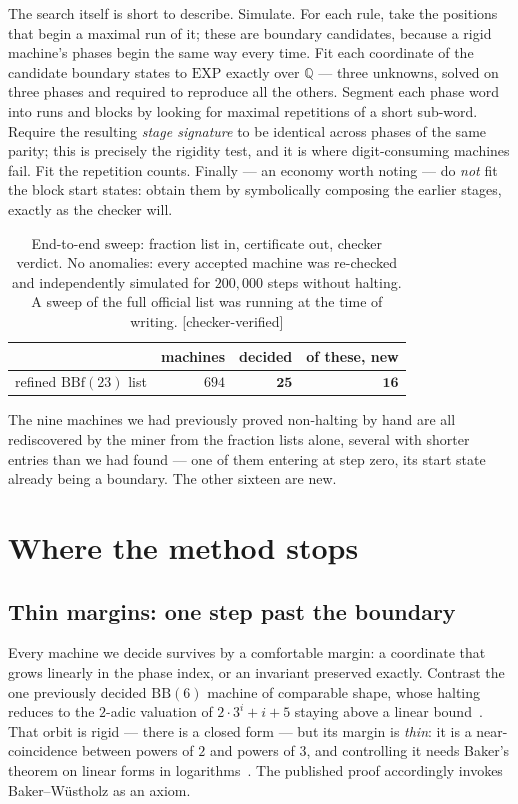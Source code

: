 \documentclass[11pt,a4paper]{article}
\theoremstyle{plain}
\theoremstyle{definition}
\newcommand{\Chk}{\textcolor{linkc}{\textsf{[checker-verified]}}}
\begin{document}
The search itself is short to describe. Simulate. For each rule, take the
positions that begin a maximal run of it; these are boundary candidates,
because a rigid machine's phases begin the same way every time. Fit each
coordinate of the candidate boundary states to $\mathrm{EXP}$ exactly over
$\mathbb{Q}$ --- three unknowns, solved on three phases and required to
reproduce all the others. Segment each phase word into runs and blocks by
looking for maximal repetitions of a short sub-word. Require the resulting
\emph{stage signature} to be identical across phases of the same parity;
this is precisely the rigidity test, and it is where digit-consuming
machines fail. Fit the repetition counts. Finally --- an economy worth
noting --- do \emph{not} fit the block start states: obtain them by
symbolically composing the earlier stages, exactly as the checker will.

\begin{table}[h]
\centering\small
\begin{tabular}{lrrr}
\toprule
& machines & decided & of these, new\\
\midrule
refined $\mathrm{BBf}(23)$ list & $694$ & $\mathbf{25}$ & $\mathbf{16}$\\
\bottomrule
\end{tabular}
\caption{End-to-end sweep: fraction list in, certificate out, checker
verdict. No anomalies: every accepted machine was re-checked and
independently simulated for $200{,}000$ steps without halting. A sweep of
the full official list was running at the time of writing. \Chk}
\label{tab:sweep}
\end{table}

The nine machines we had previously proved non-halting by hand are all
rediscovered by the miner from the fraction lists alone, several with
shorter entries than we had found --- one of them entering at step zero,
its start state already being a boundary. The other sixteen are new.

\section{Where the method stops}\label{sec:limits}

\subsection{Thin margins: one step past the boundary}

Every machine we decide survives by a comfortable margin: a coordinate
that grows linearly in the phase index, or an invariant preserved
exactly. Contrast the one previously decided $\mathrm{BB}(6)$ machine of
comparable shape, whose halting reduces to the $2$-adic valuation of
$2\cdot 3^{i} + i + 5$ staying above a linear bound~\cite{bwmachine}.
That orbit is rigid --- there is a closed form --- but its margin is
\emph{thin}: it is a near-coincidence between powers of $2$ and powers of
$3$, and controlling it needs Baker's theorem on linear forms in
logarithms~\cite{bakerwustholz}. The published proof accordingly invokes
Baker--W\"ustholz as an axiom.
\end{document}
